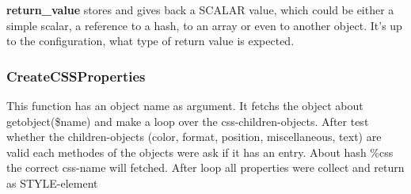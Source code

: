\textbf{return\_value} stores and gives back a SCALAR value, which could be either a
simple scalar, a reference to a hash, to an array or even to another object.
It's up to the configuration, what type of return value is expected.

\subsubsection*{CreateCSSProperties\label{CreateCSSProperties}}


This function has an object name as argument. It fetchs the object about getobject(\$name) and make a loop over the css-children-objects. After test whether the children-objects (color, format, position, miscellaneous, text) are valid each methodes of the objects were ask if it has an entry. About hash \%css the correct css-name will fetched. After loop all properties were collect and return as STYLE-element

